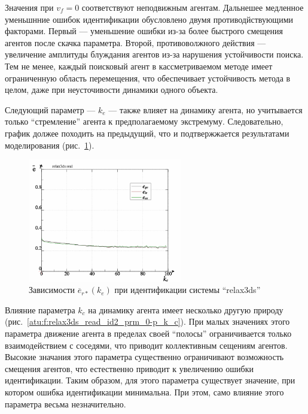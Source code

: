 Значения при $v_f = 0$ соответствуют неподвижным агентам.
Дальнешее медленное уменьшнние ошибок идентификации
обусловлено двумя противодйствующими факторами.
Первый --- уменьшение ошибки из-за более быстрого
смещения агентов после скачка параметра.
Второй, противоволжного действия --- увеличение амплитуды блуждания
агентов из-за нарушения устойчивости поиска. Тем не менее,
каждый поисковый агент в кассметриваемом методе
имеет ограниченную область перемещения,
что обеспечивает устойчивость метода в целом, даже при
неусточивости динамики одного объекта.

Следующий параметр --- $k_e$ --- также влияет на динамику
агента, но учитывается только ``стремление'' агента
к предполагаемому экстремуму. Следовательно,
график должее походить на предыдущий, что и подтвержжается результатами моделирования
(рис.~\ref{atu:f:relax3ds_read_id2_prm_0-p_k_e}).

\begin{figure}[htb!]
  \centerline{\includegraphics[width=0.6\textwidth]{p/relax3ds_read_id2_prm_0-p_k_e.png} }
  \caption{Зависимости $\overline{e}_{r*}(k_e)$ при идентификации системы ``relax3ds''}
  \label{atu:f:relax3ds_read_id2_prm_0-p_k_e}
\end{figure}

Влияние параметра $k_c$ на динамику агента имеет несколько другую природу
(рис.~\ref{atu:f:relax3ds_read_id2_prm_0-p_k_c}).
При малых значениях этого параметра движение агента в пределах
своей ``полосы'' ограничивается только взаимодействием с соседями,
что приводит коллективным сещениям агентов.
Высокие значания этого параметра существенно ограничивают
возможность смещения агентов, что естественно приводит
к увеличению ошибки идентификации. Таким образом,
для этого параметра существует значение,
при котором ошибка идентификации минимальна. При этом,
само влияние этого параметра весьма незначительно.

